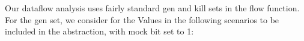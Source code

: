 



Our dataflow analysis uses fairly standard gen and kill sets in the flow function. For the gen set, we consider for the Values in the following scenarios to be included in the abstraction, with mock bit set to 1:

